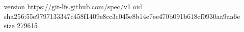version https://git-lfs.github.com/spec/v1
oid sha256:55e9797133347c458f1409e8cc3c045e8b14e7ee470b091b618cf0930aa9aa6e
size 279615

